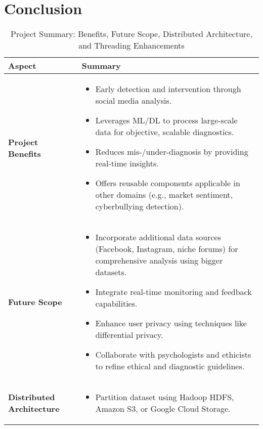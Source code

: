 
\section{Conclusion}

\begin{table}[H]
    \caption*{Project Summary: Benefits, Future Scope, Distributed Architecture, and Threading Enhancements}
    \label{tab:project_summary}
    \begin{tabularx}{\textwidth}{|>{\raggedright\arraybackslash}p{3cm}|X|}
    \hline
    \textbf{Aspect} & \textbf{Summary} \\ \hline
    \textbf{Project Benefits} & 
    \begin{itemize}[noitemsep, leftmargin=*, topsep=0pt]
        \item Early detection and intervention through social media analysis.
        \item Leverages ML/DL to process large-scale data for objective, scalable diagnostics.
        \item Reduces mis-/under-diagnosis by providing real-time insights.
        \item Offers reusable components applicable in other domains (e.g., market sentiment, cyberbullying detection).
    \end{itemize} \\ \hline
    \textbf{Future Scope} & 
    \begin{itemize}[noitemsep, leftmargin=*, topsep=0pt]
        \item Incorporate additional data sources (Facebook, Instagram, niche forums) for comprehensive analysis using bigger datasets.
        \item Integrate real-time monitoring and feedback capabilities.
        \item Enhance user privacy using techniques like differential privacy.
        \item Collaborate with psychologists and ethicists to refine ethical and diagnostic guidelines.
    \end{itemize} \\ \hline
    \textbf{Distributed Architecture} & 
    \begin{itemize}[noitemsep, leftmargin=*, topsep=0pt]
        \item Partition dataset using Hadoop HDFS, Amazon S3, or Google Cloud Storage.

\end{itemize}
\end{tabularx}
\end{table}
